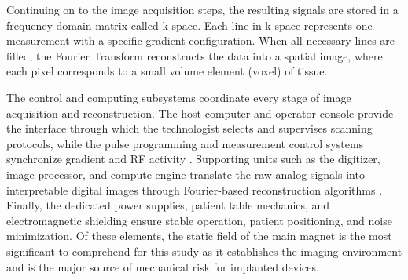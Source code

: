 Continuing on to the image acquisition steps, the resulting signals are stored in a frequency domain matrix called k-space. Each line in k-space represents one measurement with a specific gradient configuration. When all necessary lines are filled, the Fourier Transform reconstructs the data into a spatial image, where each pixel corresponds to a small volume element (voxel) of tissue.

The control and computing subsystems coordinate every stage of image acquisition and reconstruction. The host computer and operator console provide the interface through which the technologist selects and supervises scanning protocols, while the pulse programming and measurement control systems synchronize gradient and RF activity \cite{bushberg2011}. Supporting units such as the digitizer, image processor, and compute engine translate the raw analog signals into interpretable digital images through Fourier-based reconstruction algorithms \cite{Prince_MedicalImaging_2015}. Finally, the dedicated power supplies, patient table mechanics, and electromagnetic shielding ensure stable operation, patient positioning, and noise minimization. Of these elements, the static field of the main magnet is the most significant to comprehend for this study as it establishes the imaging environment and is the major source of mechanical risk for implanted devices.


%